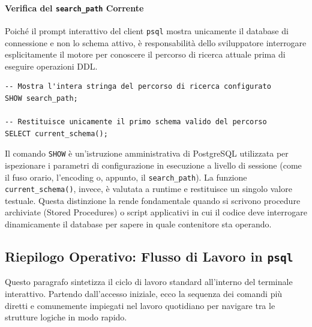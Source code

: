 \paragraph{Verifica del \texttt{search\_path} Corrente}

Poiché il prompt interattivo del client \texttt{psql} mostra unicamente il database di connessione e non lo schema attivo, è responsabilità dello sviluppatore interrogare esplicitamente il motore per conoscere il percorso di ricerca attuale prima di eseguire operazioni DDL.

\begin{lstlisting}[language=PostgreSQL, title=Comandi di ispezione della sessione]
-- Mostra l'intera stringa del percorso di ricerca configurato
SHOW search_path;

-- Restituisce unicamente il primo schema valido del percorso
SELECT current_schema();
\end{lstlisting}

\begin{dettagli}
Il comando \texttt{SHOW} è un'istruzione amministrativa di PostgreSQL utilizzata per ispezionare i parametri di configurazione in esecuzione a livello di sessione (come il fuso orario, l'encoding o, appunto, il \texttt{search\_path}). 
La funzione \texttt{current\_schema()}, invece, è valutata a runtime e restituisce un singolo valore testuale. Questa distinzione la rende fondamentale quando si scrivono procedure archiviate (Stored Procedures) o script applicativi in cui il codice deve interrogare dinamicamente il database per sapere in quale contenitore sta operando.
\end{dettagli}

\subsection{Riepilogo Operativo: Flusso di Lavoro in \texttt{psql}}

Questo paragrafo sintetizza il ciclo di lavoro standard all'interno del terminale interattivo. Partendo dall'accesso iniziale, ecco la sequenza dei comandi più diretti e comunemente impiegati nel lavoro quotidiano per navigare tra le strutture logiche in modo rapido.

